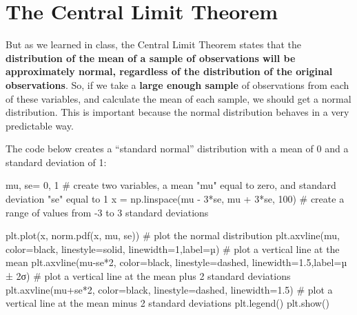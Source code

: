 \documentclass[
  letterpaper,
  DIV=11,
  numbers=noendperiod]{scrreprt}
\newenvironment{Shaded}{\begin{snugshade}}{\end{snugshade}}
\newcommand{\CommentTok}[1]{\textcolor[rgb]{0.37,0.37,0.37}{#1}}
\newcommand{\DecValTok}[1]{\textcolor[rgb]{0.68,0.00,0.00}{#1}}
\newcommand{\FloatTok}[1]{\textcolor[rgb]{0.68,0.00,0.00}{#1}}
\newcommand{\NormalTok}[1]{\textcolor[rgb]{0.00,0.23,0.31}{#1}}
\newcommand{\OperatorTok}[1]{\textcolor[rgb]{0.37,0.37,0.37}{#1}}
\newcommand{\StringTok}[1]{\textcolor[rgb]{0.13,0.47,0.30}{#1}}
\begin{document}
\hypertarget{the-central-limit-theorem}{%
\section{The Central Limit Theorem}\label{the-central-limit-theorem}}

But as we learned in class, the Central Limit Theorem states that the
\textbf{distribution of the mean of a sample of observations will be
approximately normal, regardless of the distribution of the original
observations}. So, if we take a \textbf{large enough sample} of
observations from each of these variables, and calculate the mean of
each sample, we should get a normal distribution. This is important
because the normal distribution behaves in a very predictable way.

The code below creates a ``standard normal'' distribution with a mean of
0 and a standard deviation of 1:

\begin{Shaded}
\begin{Highlighting}[]
\NormalTok{mu, se}\OperatorTok{=} \DecValTok{0}\NormalTok{, }\DecValTok{1} \CommentTok{\# create two variables, a mean "mu" equal to zero, and standard deviation "se" equal to 1}
\NormalTok{x }\OperatorTok{=}\NormalTok{ np.linspace(mu }\OperatorTok{{-}} \DecValTok{3}\OperatorTok{*}\NormalTok{se, mu }\OperatorTok{+} \DecValTok{3}\OperatorTok{*}\NormalTok{se, }\DecValTok{100}\NormalTok{) }\CommentTok{\# create a range of values from {-}3 to 3 standard deviations}

\NormalTok{plt.plot(x, norm.pdf(x, mu, se)) }\CommentTok{\# plot the normal distribution}
\NormalTok{plt.axvline(mu, color}\OperatorTok{=}\StringTok{\textquotesingle{}black\textquotesingle{}}\NormalTok{, linestyle}\OperatorTok{=}\StringTok{\textquotesingle{}solid\textquotesingle{}}\NormalTok{, linewidth}\OperatorTok{=}\DecValTok{1}\NormalTok{,label}\OperatorTok{=}\StringTok{\textquotesingle{}µ\textquotesingle{}}\NormalTok{)  }\CommentTok{\# plot a vertical line at the mean}
\NormalTok{plt.axvline(mu}\OperatorTok{{-}}\NormalTok{se}\OperatorTok{*}\DecValTok{2}\NormalTok{, color}\OperatorTok{=}\StringTok{\textquotesingle{}black\textquotesingle{}}\NormalTok{, linestyle}\OperatorTok{=}\StringTok{\textquotesingle{}dashed\textquotesingle{}}\NormalTok{, linewidth}\OperatorTok{=}\FloatTok{1.5}\NormalTok{,label}\OperatorTok{=}\StringTok{\textquotesingle{}µ ± 2σ\textquotesingle{}}\NormalTok{) }\CommentTok{\# plot a vertical line at the mean plus 2 standard deviations}
\NormalTok{plt.axvline(mu}\OperatorTok{+}\NormalTok{se}\OperatorTok{*}\DecValTok{2}\NormalTok{, color}\OperatorTok{=}\StringTok{\textquotesingle{}black\textquotesingle{}}\NormalTok{, linestyle}\OperatorTok{=}\StringTok{\textquotesingle{}dashed\textquotesingle{}}\NormalTok{, linewidth}\OperatorTok{=}\FloatTok{1.5}\NormalTok{)  }\CommentTok{\# plot a vertical line at the mean minus 2 standard deviations}
\NormalTok{plt.legend()}
\NormalTok{plt.show()}
\end{Highlighting}
\end{Shaded}
\end{document}
